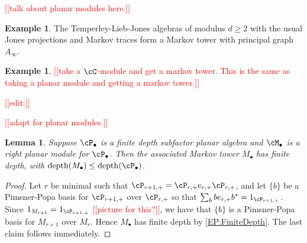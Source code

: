 \documentclass[11pt]{article}
\theoremstyle{plain}
\newtheorem{lem}[thm]{Lemma}
\theoremstyle{definition}
\newtheorem{ex}[thm]{Example}
\newcommand{\nn}[1]{\textcolor{red}{[[#1]]}}
\newcommand{\roundNbox}[6]{
	\draw[rounded corners=5pt, very thick, #1] ($#2+(-#3,-#3)+(-#4,0)$) rectangle ($#2+(#3,#3)+(#5,0)$);
	\coordinate (ZZa) at ($#2+(-#4,0)$);
	\coordinate (ZZb) at ($#2+(#5,0)$);
	\node at ($1/2*(ZZa)+1/2*(ZZb)$) {#6};
}
\begin{document}
\nn{talk about planar modules here.}


\begin{ex}
The Temperley-Lieb-Jones algebras of modulus $d\geq 2$ with the usual Jones projections and Markov traces form a Markov tower with principal graph $A_{\infty}$.
\end{ex}


\begin{ex}
\nn{take a $\cC$-module and get a markov tower.
This is the same as taking a planar module and getting a markov tower.}
\end{ex}

\nn{edit:}

\nn{adapt for planar modules.}

\begin{lem}
Suppose $\cP_\bullet$ is a finite depth subfactor planar algebra and $\cM_\bullet$ is a right planar module for $\cP_\bullet$.
Then the associated Markov tower $M_\bullet$ has finite depth, with $\operatorname{depth}(M_\bullet) \leq \operatorname{depth}(\cP_\bullet)$.
\end{lem}
\begin{proof}
Let $r$ be minimal such that $\cP_{r+1,+} = \cP_{r,+} e_{r,+}\cP_{r,+}$, and let $\{b\}$ be a Pimsner-Popa basis for $\cP_{r+1,+}$ over $\cP_{r,+}$ so that $\sum_b b e_{r,+} b^* = 1_{\cP_{r+1,+}}$.
Since $1_{M_{r+1}} = 1_{\cP_{r+1,+}}$ \nn{picture for this?}, we have that
$\{b\}$ is a Pimsner-Popa basis for $M_{r+1}$ over $M_r$.
Hence $M_\bullet$ has finite depth by \ref{EP:FiniteDepth}.
The last claim follows immediately.
\end{proof}
\end{document}
